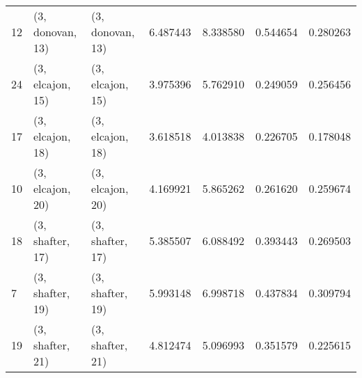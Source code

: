 \begin{tabular}{lllrrrr}
12 &  (3, donovan, 13) &  (3, donovan, 13) &  6.487443 &  8.338580 &   0.544654 &  0.280263 \\
24 &  (3, elcajon, 15) &  (3, elcajon, 15) &  3.975396 &  5.762910 &   0.249059 &  0.256456 \\
17 &  (3, elcajon, 18) &  (3, elcajon, 18) &  3.618518 &  4.013838 &   0.226705 &  0.178048 \\
10 &  (3, elcajon, 20) &  (3, elcajon, 20) &  4.169921 &  5.865262 &   0.261620 &  0.259674 \\
18 &  (3, shafter, 17) &  (3, shafter, 17) &  5.385507 &  6.088492 &   0.393443 &  0.269503 \\
7  &  (3, shafter, 19) &  (3, shafter, 19) &  5.993148 &  6.998718 &   0.437834 &  0.309794 \\
19 &  (3, shafter, 21) &  (3, shafter, 21) &  4.812474 &  5.096993 &   0.351579 &  0.225615 \\
\bottomrule
\end{tabular}
